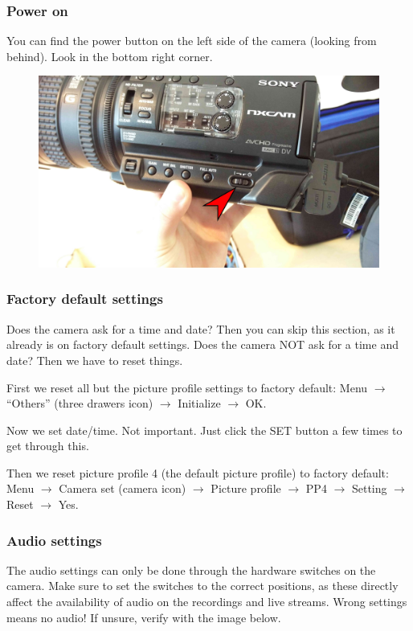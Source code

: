 \documentclass{article}
\begin{document}
\subsubsection{Power on}
You can find the power button on the left side of the camera (looking from behind). Look in the bottom right corner.

\begin{figure}[H]
  \centering
\includegraphics[width = 120mm]{Sony03.jpg}
\end{figure}

\subsubsection{Factory default settings}
Does the camera ask for a time and date? Then you can skip this section, as it already is on factory default settings.
Does the camera NOT ask for a time and date? Then we have to reset things.

First we reset all but the picture profile settings to factory default:
Menu $\rightarrow$ ``Others'' (three drawers icon) $\rightarrow$ Initialize $\rightarrow$ OK.

Now we set date/time. Not important. Just click the SET button a few times to get through this.

Then we reset picture profile 4 (the default picture profile) to factory default:
Menu $\rightarrow$ Camera set (camera icon) $\rightarrow$ Picture profile $\rightarrow$ PP4 $\rightarrow$ Setting $\rightarrow$ Reset $\rightarrow$ Yes.

\subsubsection{Audio settings}
The audio settings can only be done through the hardware switches on the camera.
Make sure to set the switches to the correct positions, as these directly affect the availability of audio on the recordings and live streams. Wrong settings means no audio!
If unsure, verify with the image below.
\end{document}
